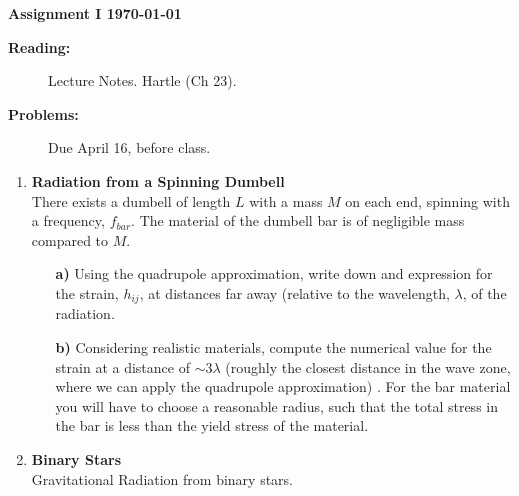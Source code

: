 \documentclass[12pt,twoside]{article}
\begin{document}
%
\centerline{\large\bf  \hfill Assignment I \hfill  \today}

\medskip
\begin{description}
\item[{\bf Reading:}] Lecture Notes. Hartle (Ch 23). \\
\item[{\bf Problems:} \hfill ] Due April 16, before class.
\end{description}


\medskip

\begin{enumerate}

\item
{\bf Radiation from a Spinning Dumbell} \\
There exists a dumbell of length $L$ with a mass $M$ on each end,
spinning with a frequency, $f_{bar}$. The
material of the dumbell bar is of negligible mass compared to $M$.
\begin{itemize}

\item[\bf a)] Using the quadrupole approximation, write down and
  expression for the strain, $h_{ij}$, at distances far away (relative to the
  wavelength, $\lambda$, of the radiation.
  

\item[\bf b)] Considering realistic materials, compute the numerical
  value for the strain at a distance of $\sim 3 \lambda$ (roughly the closest distance in the wave zone, where we can apply the quadrupole approximation) . For the bar
  material you will have to choose a reasonable radius, such that the
  total stress in the bar is less than the yield stress of the
  material. 
  

\end{itemize}

\item
{\bf Binary Stars} \\
Gravitational Radiation from binary stars.
\begin{itemize}


\end{itemize}
\end{enumerate}
\end{document}
